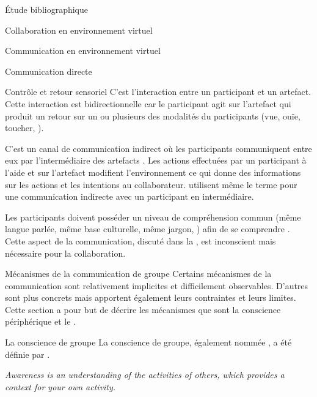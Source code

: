 \documentclass[myfrancais,ngerman,english,french]{mythesis}
\begin{document}
\begin{mychapter}{Étude bibliographique}
\begin{mysection}{Collaboration en environnement virtuel}
\begin{mysubsection}{Communication en environnement virtuel}
\begin{mysubsubsection}{Communication directe}
				\end{mysubsubsection}
				\begin{mysubsubsection}{Contrôle et retour sensoriel}
					C'est l'interaction entre un participant et un artefact.
					Cette interaction est bidirectionnelle car le participant agit sur l'artefact qui produit un retour sur un ou plusieurs des modalités du participants (vue, ouïe, toucher, \myetc).
				\end{mysubsubsection}
				\begin{mysubsubsection}{\myFeedthrough}
					C'est un canal de communication indirect où les participants communiquent entre eux par l'intermédiaire des artefacts .
					Les actions effectuées par un participant à l'aide et sur l'artefact modifient l'environnement ce qui donne des informations sur les actions et les intentions au collaborateur.
					 utilisent même le terme \myfeedthrough pour une communication indirecte avec un participant en intermédiaire.
				\end{mysubsubsection}
				\begin{mysubsubsection}{\myGrounding}
					Les participants doivent posséder un niveau de compréhension commun (même langue parlée, même base culturelle, même jargon, \myetc) afin de se comprendre .
					Cette aspect de la communication, discuté dans la , est inconscient mais nécessaire pour la collaboration.
				\end{mysubsubsection}
			\end{mysubsection}
			\begin{mysubsection}{Mécanismes de la communication de groupe}
				Certains mécanismes de la communication sont relativement implicites et difficilement observables.
				D'autres sont plus concrets mais apportent également leurs contraintes et leurs limites.
				Cette section a pour but de décrire les mécanismes que sont la conscience périphérique et le \mygrounding.
				\begin{mysubsubsection}{La conscience de groupe}
					La conscience de groupe, également nommée \myawareness, a été définie par .
					\begin{myquote}[english]
						\it Awareness is an understanding of the activities of others, which provides a context for your own activity.

\end{myquote}
\end{mysubsubsection}
\end{mysubsection}
\end{mysection}
\end{mychapter}
\end{document}
